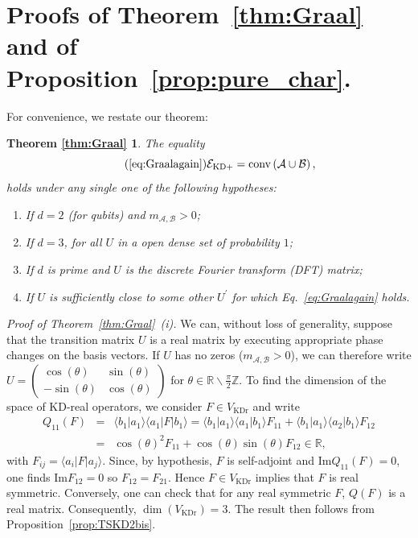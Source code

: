 \documentclass[a4paper, notitlepage, 11pt]{article}
\numberwithin{equation}{section}
\newcommand{\red}[1]{\textcolor{red}{#1}}
\newcommand{\bra}[1]{\langle #1|}
\newcommand{\cket}[1]{|#1\rangle}
\newcommand{\bracket}[2]{\langle #1|#2\rangle}
\newcommand{\Acal}{{\mathcal A}}
\newcommand{\Bcal}{{\mathcal B}}
\newcommand{\EcalKDC}{{\mathcal E}_{\mathrm{KD+}}}
\newcommand{\Ker}{{\mathrm{Ker}}}
\newcommand{\Z}{\mathbb{Z}}
\newcommand{\R}{\mathbb{R}}
\newcommand{\mab}{m_{\Acal,\Bcal}}
\newcommand{\conv}[1]{\mathrm{conv}\left(#1\right)}
\newcommand{\VR}{V_{\mathrm{KDr}}}
\renewcommand{\Im}[1]{\mathrm{Im}#1}
\newcommand{\Ran}[1]{\mathrm{Ran}\left(#1\right)}
\newcommand{\convAB}{\conv{\Acal \cup \Bcal}}
\newtheorem*{thmIntro}{Theorem \ref{thm:Graal}}
\begin{document}
\section{Proofs of Theorem~\ref{thm:Graal} and of Proposition~\ref{prop:pure_char}.}\label{s:graalproof}
For convenience, we restate {our} theorem:
\begin{thmIntro}
The equality
\begin{equation}\tag{\ref{eq:Graalagain}}
\EcalKDC=\convAB,
\end{equation}
holds under any single one of the following hypotheses:
\begin{enumerate}[label=(\roman*),wide, labelindent=0pt]
    \item If $d=2$ (for qubits) and $\mab>0$;
    \item If $d=3$, for all $U$ in a open dense set of probability $1$;
    \item If $d$ is prime and $U$ is the discrete Fourier transform (DFT) matrix;
    \item If $U$ is sufficiently close to some other $U^{\prime}$ for which Eq.~\eqref{eq:Graalagain} holds.
\end{enumerate}
\end{thmIntro}
\noindent\emph{Proof of Theorem~\ref{thm:Graal}~(i).}
We can, without loss of generality, suppose that the transition matrix $U$ is a real matrix by executing appropriate phase changes on the basis vectors. 
If  $U$ has no zeros ($\mab>0$), we can therefore write $U=\begin{pmatrix} \cos(\theta) & \sin(\theta) \\ -\sin(\theta) & \cos(\theta) \end{pmatrix}$ for $\theta\in\R\backslash\frac{\pi}{2}\Z$. To find the dimension of the space of KD-real operators, we consider $F\in\VR$ and write
\begin{eqnarray*}
Q_{11}(F) &=& \bracket{b_1}{a_1}\bra{a_1}F\cket{b_1} =  \bracket{b_1}{a_1}\bracket{a_1}{b_1}F_{11} +  \bracket{b_1}{a_1}\bracket{a_2}{b_1}F_{12}\\
&=&   \cos(\theta)^2F_{11} +  \cos(\theta)\sin(\theta)F_{12}\in\R,
\end{eqnarray*}
with $F_{ij}=\langle a_i|F|a_j\rangle$.
Since, by hypothesis, $F$ is self-adjoint and $\Im{Q_{1 1}(F)}=0$, one finds  $\Im{F_{12}}=0$ so $F_{12} = F_{21}$.
Hence $F\in \VR$ implies that $F$ is real symmetric. Conversely, one {can check} that for any real symmetric $F$, $Q(F)$ is a real matrix. Consequently, $\dim(\VR)=3$. The result then follows from Proposition~\ref{prop:TSKD2bis}.
\end{document}
